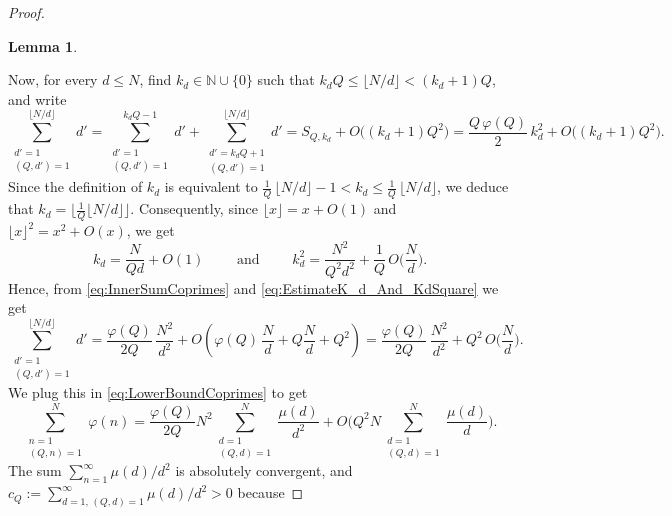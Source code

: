 \documentclass[11pt,reqno]{amsart}
\newtheorem{lem}[thm]{Lemma}
\theoremstyle{definition}
\begin{document}
\begin{proof}
\begin{lem}
\begin{equation}
\end{equation}
\end{lem}
Now, 
for every $d \leq N$, 
find $k_d \in \mathbb N\cup \{ 0 \}$ such that $k_dQ \leq \lfloor N/d \rfloor < (k_d+1)Q$, and write 
\begin{equation}\label{eq:InnerSumCoprimes}
\sum_{\substack{ d'=1 \\  (Q,d') = 1  } }^{\lfloor N/d \rfloor} d'  
= \sum_{\substack{ d'=1 \\  (Q,d') = 1  } }^{k_dQ - 1} d'  + \sum_{\substack{ d' = k_dQ + 1 \\  (Q,d') = 1  } }^{\lfloor N/d \rfloor} d'  = S_{Q,k_d} + O\Big(  (k_d+1)Q^2 \Big)
= \frac{Q \, \varphi(Q)}{2} \, k_d^2 + O\Big( (k_d+1)Q^2 \Big).
\end{equation}
Since the definition of $k_d$ is equivalent to 
$\frac{1}{Q} \, \lfloor  N/d\rfloor - 1  <  k_d \leq \frac{1}{Q} \, \lfloor  N/d\rfloor$,
we deduce that
$k_d = \lfloor \frac{1}{Q} \lfloor N/d \rfloor  \rfloor$.
Consequently, 
since $\lfloor x \rfloor = x + O(1)$ 
and $\lfloor x \rfloor^2 = x^2 + O(x)$, we get
\begin{equation}\label{eq:EstimateK_d_And_KdSquare}
k_d 
= \frac{N}{Qd} + O(1)
\qquad \text{ and } \qquad 
k_d^2 = \frac{N^2}{Q^2d^2} + \frac{1}{Q} \, O\Big( \frac{N}{d} \Big).
\end{equation}
Hence, from \eqref{eq:InnerSumCoprimes} and \eqref{eq:EstimateK_d_And_KdSquare} we get 
\begin{equation}
\sum_{\substack{ d'=1 \\  (Q,d') = 1  } }^{\lfloor N/d \rfloor} d'  
= \frac{ \varphi(Q)}{2Q}\, \frac{N^2}{ d^2} 
+ O \left(   
\varphi(Q)\, \frac{N}{d} + Q\frac{N}{d} + Q^2
\right)
= \frac{ \varphi(Q)}{2Q}\, \frac{N^2}{ d^2} 
+ Q^2 \, O \bigg( \frac{N}{d}\bigg).
\end{equation}
We plug this in \eqref{eq:LowerBoundCoprimes} to get
\begin{equation}
\sum_{\substack{ n=1 \\  (Q,n) = 1  } }^N \varphi(n) 
= \frac{\varphi(Q)}{2Q} N^2 \sum_{\substack{ d=1 \\  (Q,d) = 1  } }^N 
\frac{\mu(d)}{ d^2} 
+   O \Big(  Q^2 N \sum_{\substack{ d=1 \\  (Q,d) = 1  } }^N \frac{\mu(d)}{d} 
\Big). 
\end{equation}
The sum $\sum_{n=1}^\infty \mu(d)/d^2$ is absolutely convergent, and $c_Q := \sum_{ d=1, \,  (Q,d) = 1  }^\infty \mu(d)/d^2 > 0$ because 

\end{proof}
\end{document}
